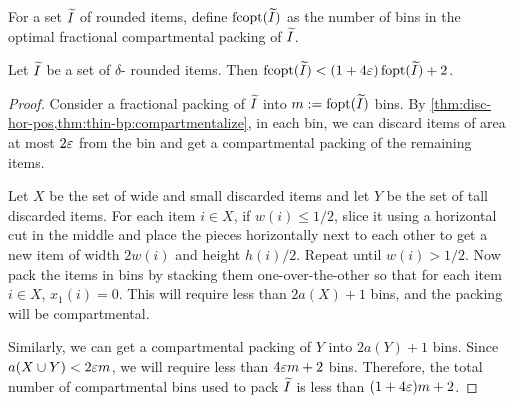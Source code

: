 For a set $\widetilde{I}$ of rounded items, define $\operatorname{fcopt}(\widetilde{I})$ as the number of bins in
the optimal fractional compartmental packing of $\widetilde{I}$.

\begin{theorem}
\label{thm:struct}
Let $\widetilde{I}$ be a set of $\delta$-\thin{} rounded items. Then
$\operatorname{fcopt}(\widetilde{I}) < (1+4\varepsilon)\operatorname{fopt}(\widetilde{I}) + 2$.
\end{theorem}
\begin{proof}
Consider a fractional packing of $\widetilde{I}$ into $m := \operatorname{fopt}(\widetilde{I})$ bins.
By \cref{thm:disc-hor-pos,thm:thin-bp:compartmentalize}, in each bin,
we can discard items of area at most $2\varepsilon$ from the bin
and get a compartmental packing of the remaining items.

Let $X$ be the set of wide and small discarded items
and let $Y$ be the set of tall discarded items.
For each item $i \in X$, if $w(i) \le 1/2$, slice it using a horizontal cut in the middle
and place the pieces horizontally next to each other to get a new item
of width $2w(i)$ and height $h(i)/2$. Repeat until $w(i) > 1/2$.
Now pack the items in bins by stacking them one-over-the-other
so that for each item $i \in X$, $x_1(i) = 0$.
This will require less than $2a(X) + 1$ bins,
and the packing will be compartmental.

Similarly, we can get a compartmental packing of $Y$ into $2a(Y) + 1$ bins.
Since $a(X \cup Y) < 2\varepsilon m$, we will require less than $4\varepsilon m + 2$ bins.
Therefore, the total number of compartmental bins used to pack $\widetilde{I}$
is less than $(1 + 4\varepsilon)m + 2$.
\end{proof}
